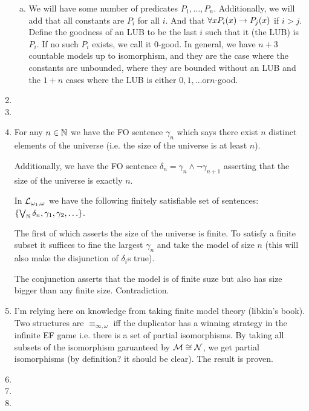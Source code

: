 \begin{enumerate}[1.]
\begin{enumerate}[a)]
    \item We will have some number of predicates \(P_1, \ldots, P_n\). Additionally, we will add that all constants are \(P_i\) for all \(i\). And that \(\forall x P_i(x) \to P_j(x)\) if \(i > j\). Define the goodness of an LUB to be the last \(i\) such that it (the LUB) is \(P_i\). If no such \(P_i\) exists, we call it \(0\)-good.  In general, we have \(n+3\) countable models up to isomorphism, and they are the case where the constants are unbounded, where they are bounded without an LUB and the \(1+n\) cases where the LUB is either \(0, 1, \ldots \text{or} n\)-good. 

  \end{enumerate}

 
\item
 
\item

\item For any \(n \in \mathbb{N}\) we have the FO sentence \(\gamma_n\) which says there exist \(n\) distinct elements of the universe (i.e. the size of the universe is at least \(n\)). 

Additionally, we have the FO sentence \(\delta_n = \gamma_n \land \neg \gamma_{n+1}\) asserting that the size of the universe is exactly \(n\). 

In \(\mathcal{L}_{\omega_1, \omega}\) we have the following finitely satisfiable set of sentences: \(\{\bigvee_{\mathbb{N}} \delta_n, \gamma_1, \gamma_2, \ldots\}\).

The first of which asserts the size of the universe is finite. To satisfy a finite subset it suffices to fine the largest \(\gamma_n\) and take the model of size \(n\) (this will also make the disjunction of \(\delta_i\)s true). 

The conjunction asserts that the model is of finite suze but also has size bigger than any finite size. Contradiction.    
 
\item I'm relying here on knowledge from taking finite model theory (libkin's book). Two structures are \(\equiv_{\infty, \omega}\) iff the duplicator has a winning strategy in the infinite EF game i.e. there is a set of partial isomorphisms. By taking all subsets of the isomorphism garuanteed by \(\mathcal{M} \cong \mathcal{N}\), we get partial isomorphisms (by definition? it should be clear). The result is proven.
 
\item
 
\item
 
\item
 
\end{enumerate}
